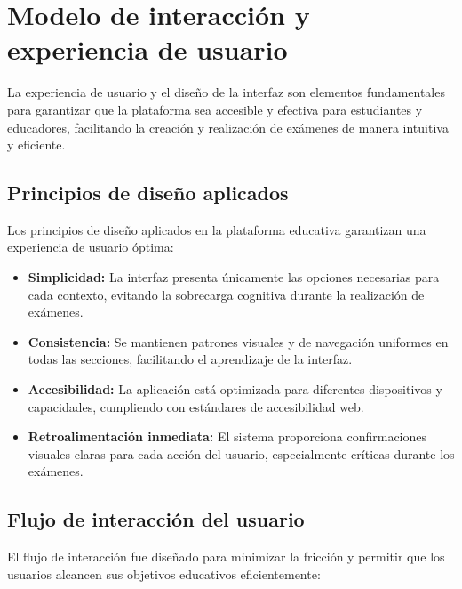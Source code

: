 \documentclass[12pt,a4paper]{report}
\begin{document}
\section{Modelo de interacción y experiencia de usuario}

La experiencia de usuario y el diseño de la interfaz son elementos fundamentales para garantizar que la plataforma sea accesible y efectiva para estudiantes y educadores, facilitando la creación y realización de exámenes de manera intuitiva y eficiente.

\subsection{Principios de diseño aplicados}

Los principios de diseño aplicados en la plataforma educativa garantizan una experiencia de usuario óptima:

\begin{itemize}
\item \textbf{Simplicidad:} La interfaz presenta únicamente las opciones necesarias para cada contexto, evitando la sobrecarga cognitiva durante la realización de exámenes.

\item \textbf{Consistencia:} Se mantienen patrones visuales y de navegación uniformes en todas las secciones, facilitando el aprendizaje de la interfaz.

\item \textbf{Accesibilidad:} La aplicación está optimizada para diferentes dispositivos y capacidades, cumpliendo con estándares de accesibilidad web.

\item \textbf{Retroalimentación inmediata:} El sistema proporciona confirmaciones visuales claras para cada acción del usuario, especialmente críticas durante los exámenes.
\end{itemize}

\subsection{Flujo de interacción del usuario}

El flujo de interacción fue diseñado para minimizar la fricción y permitir que los usuarios alcancen sus objetivos educativos eficientemente:
\end{document}

